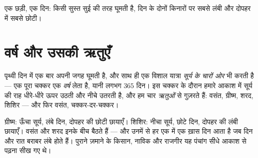 \begin{omfigure}

{\small एक छड़ी, एक दिन:  किसी सुस्त सुई की तरह घूमती है, दिन के
दोनों किनारों पर सबसे लंबी और दोपहर में सबसे छोटी।}
\end{omfigure}

\section{वर्ष और उसकी ऋतुएँ}

\begin{definition}[वर्ष और ऋतुएँ]\label{def:g3:sun-days-seasons:year}
पृथ्वी दिन में एक बार अपनी जगह घूमती है, और साथ ही एक विशाल यात्रा
\emph{सूर्य के चारों ओर} भी करती है --- एक पूरा चक्कर एक
\emph{वर्ष} लेता है, यानी लगभग $365$ दिन। इस चक्कर के
दौरान हमारे आकाश में सूर्य की राह धीरे-धीरे ऊपर उठती और नीचे उतरती
है, और हम चार \emph{ऋतुओं} से गुज़रते हैं: वसंत, ग्रीष्म,
शरद, शिशिर --- और फिर वसंत, चक्कर-दर-चक्कर।
\end{definition}

\begin{example}[चार पहर]\label{ex:g3:sun-days-seasons:quarters}
ग्रीष्म: ऊँचा सूर्य, लंबे दिन, दोपहर की छोटी छायाएँ। शिशिर: नीचा
सूर्य, छोटे दिन, दोपहर की लंबी छायाएँ। वसंत और शरद इनके बीच बैठते हैं
--- और उनमें से हर एक में एक ख़ास दिन आता है जब दिन और रात बराबर लंबे
होते हैं। पुराने ज़माने के किसान, नाविक और राजगीर यह पंचांग सीधे आकाश
से पढ़ना सीख गए थे।
\end{example}

